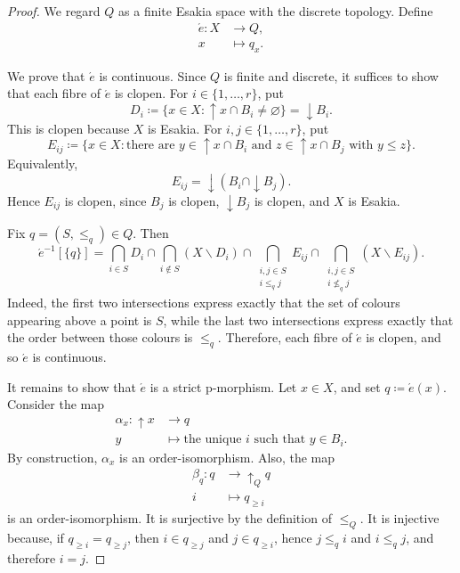\documentclass[12pt]{amsart}
\theoremstyle{plain}
\theoremstyle{definition}
\renewcommand{\u}{{\uparrow}}
\renewcommand{\d}{{\downarrow}}
\begin{document}
\begin{proof}
    We regard $Q$ as a finite Esakia space with the discrete topology. Define
    \begin{align*}
        \acute{e}\colon X &\longrightarrow Q,\\
        x & \longmapsto q_x.
    \end{align*}
    
    We prove that $\acute{e}$ is continuous. Since $Q$ is finite and discrete, it suffices to show that
    each fibre of $\acute{e}$ is clopen. For $i\in\{1,\dots,r\}$, put
    \[
        D_i\coloneqq \{x\in X:{\u}x\cap B_i\neq\varnothing\}
        =
        {\d}B_i.
    \]
    This is clopen because $X$ is Esakia. For $i,j\in\{1,\dots,r\}$, put
    \[
        E_{ij}\coloneqq
        \{x\in X:\text{there are }y\in{\u}x\cap B_i
        \text{ and }z\in{\u}x\cap B_j\text{ with }y\leq z\}.
    \]
    Equivalently,
    \[
        E_{ij}={\d}(B_i\cap{\d}B_j).
    \]
    Hence $E_{ij}$ is clopen, since $B_j$ is clopen, ${\d}B_j$ is clopen, and $X$ is
    Esakia.

    Fix $q=(S,\leq_q)\in Q$. Then
    \[
        \acute{e}^{-1}[\{q\}]
        =\bigcap_{i\in S}D_i
        \cap
        \bigcap_{i\notin S}(X\smallsetminus D_i)\cap \bigcap_{\substack{i,j\in S\\ i\leq_q j}}E_{ij}
        \cap \bigcap_{\substack{i,j\in S\\ i\not\leq_q j}}(X\smallsetminus E_{ij}).
    \]
    Indeed, the first two intersections express exactly that the set of colours appearing above a point is $S$, while the last two intersections express exactly that the order between those colours is $\leq_q$. Therefore, each fibre of $\acute{e}$ is clopen, and so $\acute{e}$ is continuous.

    It remains to show that $\acute{e}$ is a strict p-morphism. Let $x\in X$, and set
    $q\coloneqq \acute{e}(x)$. Consider the map
    \begin{align*}
        \alpha_x\colon {\u}x &\longrightarrow q\\
        y &\longmapsto \text{the unique }i\text{ such that }y\in B_i.
    \end{align*}
    By construction, $\alpha_x$ is an order-isomorphism. Also, the map
    \begin{align*}
        \beta_q\colon q &\longrightarrow {\u}_Q q\\
        i &\longmapsto q_{\geq i}
    \end{align*}
    is an order-isomorphism. It is surjective by the definition of $\leq_Q$. It is injective
    because, if $q_{\geq i}=q_{\geq j}$, then $i\in q_{\geq j}$ and $j\in q_{\geq i}$, hence
    $j\leq_q i$ and $i\leq_q j$, and therefore $i=j$.


\end{proof}
\end{document}
